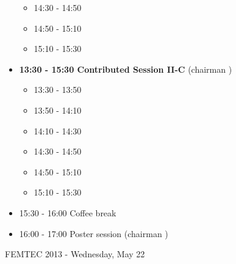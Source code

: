 \documentclass[10pt, A4]{article}%
\begin{document}
\begin{itemize}
\begin{itemize}
    \item 14:30 - 14:50 
    \item 14:50 - 15:10 
    \item 15:10 - 15:30 
  \end{itemize}
\newpage
    \item {\bf 13:30 - 15:30 Contributed Session II-C} (chairman ) 
  \begin{itemize}
    \item 13:30 - 13:50 
    \item 13:50 - 14:10 
    \item 14:10 - 14:30 
    \item 14:30 - 14:50 
    \item 14:50 - 15:10 
    \item 15:10 - 15:30 
  \end{itemize}
  \item 15:30 - 16:00 Coffee break
  \item 16:00 - 17:00 Poster session (chairman )
\end{itemize}

\newpage

\centerline{\huge FEMTEC 2013 - Wednesday, May 22}
\vspace{4mm}
\end{document}
